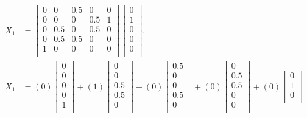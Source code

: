 \documentclass[12pt,final]{article}
\begin{document}
\begin{subequations}
\begin{align}
  X_1 &= \begin{bmatrix}
    0 & 0 & 0.5 & 0 & 0 \\
    0 & 0 & 0 & 0.5 & 1 \\
		0 & 0.5 & 0 & 0.5 & 0 \\
		0 & 0.5 & 0.5 & 0 & 0 \\
		1 & 0 & 0 & 0 & 0 \\
  \end{bmatrix}
  \begin{bmatrix}
		0 \\
		1 \\
		0 \\
		0 \\
		0 \\
	\end{bmatrix}, \\
  X_1 &= (0)\begin{bmatrix}
    0 \\
    0 \\
		0 \\
		0 \\
		1 \\
  \end{bmatrix} +
  (1)\begin{bmatrix}
    0 \\
    0 \\
		0.5 \\
		0.5 \\
		0 \\
  \end{bmatrix} +
  (0)\begin{bmatrix}
    0.5 \\
    0 \\
		0 \\
		0.5 \\
		0 \\
  \end{bmatrix} +
	(0)\begin{bmatrix}
    0 \\
    0.5 \\
		0.5 \\
		0 \\
		0 \\
  \end{bmatrix} +
	(0)\begin{bmatrix}
    0 \\
    1 \\
		0 \\

\end{bmatrix}
\end{align}
\end{subequations}
\end{document}
